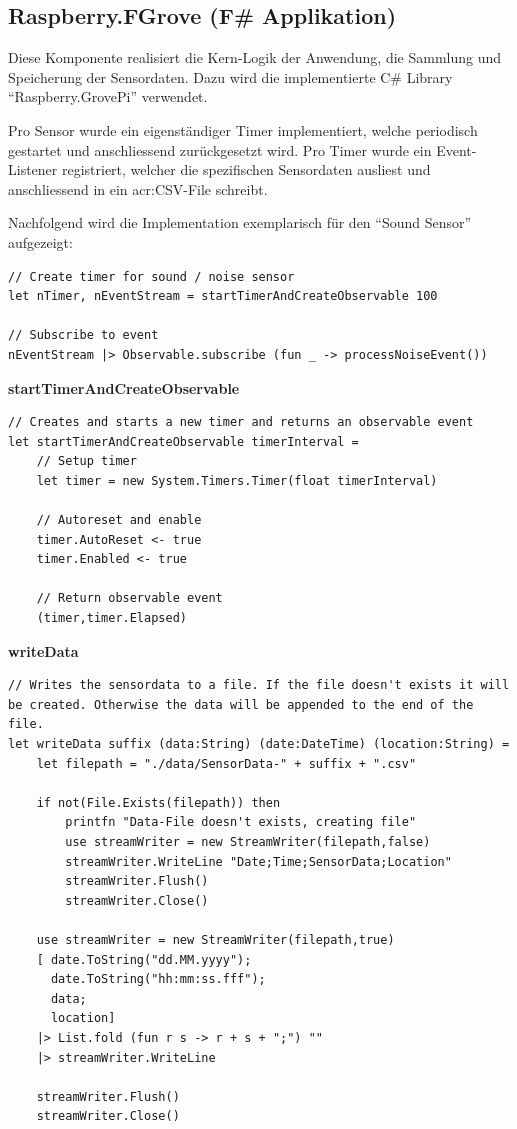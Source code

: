 \subsection{Raspberry.FGrove (F\# Applikation)}
\label{sec:AnalyseCollection:application}
Diese Komponente realisiert die Kern-Logik der Anwendung, die Sammlung und Speicherung der Sensordaten. Dazu wird die implementierte C\# Library "`Raspberry.GrovePi"' verwendet.

Pro Sensor wurde ein eigenständiger Timer implementiert, welche periodisch gestartet und anschliessend zurückgesetzt wird. Pro Timer wurde ein Event-Listener registriert, welcher die spezifischen Sensordaten ausliest und anschliessend in ein \gls{acr:CSV}-File schreibt.

Nachfolgend wird die Implementation exemplarisch für den "`Sound Sensor"' aufgezeigt:
\begin{lstlisting}
// Create timer for sound / noise sensor
let nTimer, nEventStream = startTimerAndCreateObservable 100 

// Subscribe to event
nEventStream |> Observable.subscribe (fun _ -> processNoiseEvent())
\end{lstlisting}

\textbf{startTimerAndCreateObservable}
\begin{lstlisting}
// Creates and starts a new timer and returns an observable event
let startTimerAndCreateObservable timerInterval =
    // Setup timer
    let timer = new System.Timers.Timer(float timerInterval)

    // Autoreset and enable
    timer.AutoReset <- true
    timer.Enabled <- true

    // Return observable event
    (timer,timer.Elapsed)
\end{lstlisting} 

\textbf{writeData}
\begin{lstlisting}
// Writes the sensordata to a file. If the file doesn't exists it will be created. Otherwise the data will be appended to the end of the file.
let writeData suffix (data:String) (date:DateTime) (location:String) = 
    let filepath = "./data/SensorData-" + suffix + ".csv"

    if not(File.Exists(filepath)) then
        printfn "Data-File doesn't exists, creating file"
        use streamWriter = new StreamWriter(filepath,false)
        streamWriter.WriteLine "Date;Time;SensorData;Location"
        streamWriter.Flush()
        streamWriter.Close()

    use streamWriter = new StreamWriter(filepath,true)
    [ date.ToString("dd.MM.yyyy");
      date.ToString("hh:mm:ss.fff");
      data;
      location]
    |> List.fold (fun r s -> r + s + ";") ""
    |> streamWriter.WriteLine

    streamWriter.Flush()
    streamWriter.Close()
\end{lstlisting} 

